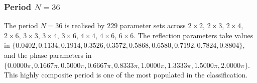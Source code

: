 \par
\subsubsection{Period $N = 36$}
The period $N=36$ is realised by $229$ parameter sets across $2\times2$, $2\times3$, $2\times4$, $2\times6$, $3\times3$, $3\times4$, $3\times6$, $4\times4$, $4\times6$, $6\times6$. The reflection parameters take values in $\{0.0402, 0.1134, 0.1914, 0.3526, 0.3572, 0.5868, 0.6580, 0.7192, 0.7824, 0.8804\}$, and the phase parameters in $\{0.0000\pi, 0.1667\pi, 0.5000\pi, 0.6667\pi, 0.8333\pi, 1.0000\pi, 1.3333\pi, 1.5000\pi, 2.0000\pi\}$. This highly composite period is one of the most populated
in the classification.
